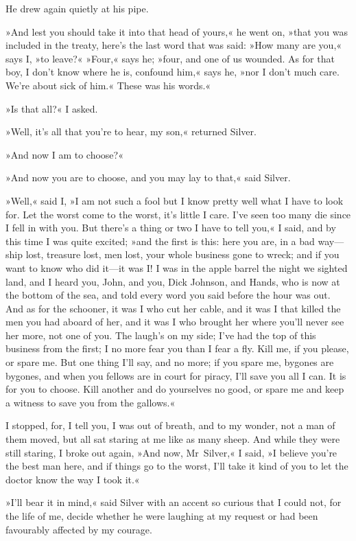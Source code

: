 He drew again quietly at his pipe.

»And lest you should take it into that head of yours,« he went on, »that you was included in the treaty, here's the last word that was said: »How many are you,« says I, »to leave?« »Four,« says he; »four, and one of us wounded. As for that boy, I don't know where he is, confound him,« says he, »nor I don't much care. We're about sick of him.« These was his words.«

»Is that all?« I asked.

»Well, it's all that you're to hear, my son,« returned Silver.

»And now I am to choose?«

»And now you are to choose, and you may lay to that,« said Silver.

»Well,« said I, »I am not such a fool but I know pretty well what I have to look for. Let the worst come to the worst, it's little I care. I've seen too many die since I fell in with you. But there's a thing or two I have to tell you,« I said, and by this time I was quite excited; »and the first is this: here you are, in a bad way—ship lost, treasure lost, men lost, your whole business gone to wreck; and if you want to know who did it—it was I! I was in the apple barrel the night we sighted land, and I heard you, John, and you, Dick Johnson, and Hands, who is now at the bottom of the sea, and told every word you said before the hour was out. And as for the schooner, it was I who cut her cable, and it was I that killed the men you had aboard of her, and it was I who brought her where you'll never see her more, not one of you. The laugh's on my side; I've had the top of this business from the first; I no more fear you than I fear a fly. Kill me, if you please, or spare me. But one thing I'll say, and no more; if you spare me, bygones are bygones, and when you fellows are in court for piracy, I'll save you all I can. It is for you to choose. Kill another and do yourselves no good, or spare me and keep a witness to save you from the gallows.«

I stopped, for, I tell you, I was out of breath, and to my wonder, not a man of them moved, but all sat staring at me like as many sheep. And while they were still staring, I broke out again, »And now, Mr~Silver,« I said, »I believe you're the best man here, and if things go to the worst, I'll take it kind of you to let the doctor know the way I took it.«

»I'll bear it in mind,« said Silver with an accent so curious that I could not, for the life of me, decide whether he were laughing at my request or had been favourably affected by my courage.

